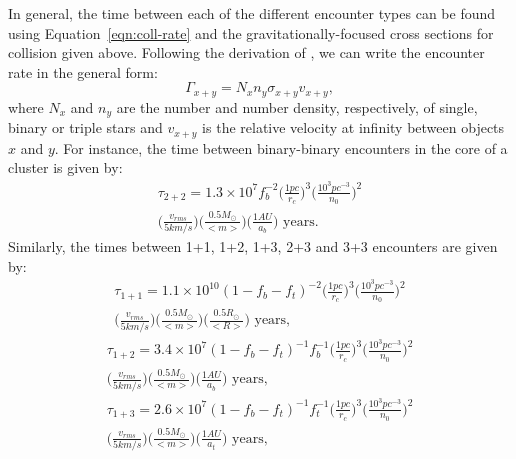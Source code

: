 In general, the time between each of the different encounter
types can be found using Equation~\ref{eqn:coll-rate} and
the gravitationally-focused cross sections for collision given
above.  Following the derivation of \citet{leonard89}, we can write
the encounter rate in the general form:
\begin{equation}
\label{eqn:coll-rate-gen}
\Gamma_{x+y} = N_xn_y{\sigma}_{x+y}v_{x+y},
\end{equation}
where $N_x$ and $n_y$ are the number and number density, respectively,
of single, binary or triple stars and $v_{x+y}$ is the relative
velocity at infinity between objects $x$ and $y$.  For instance, the
time between binary-binary encounters in the core of a cluster is
given by:
\begin{equation}
\begin{gathered}
\label{eqn:coll2+2}
\tau_{2+2} = 1.3 \times 10^7f_b^{-2} \Big(\frac{1
  pc}{r_c}\Big)^3\Big(\frac{10^3
  pc^{-3}}{n_0}\Big)^2 \\
\Big(\frac{v_{rms}}{5 km/s}\Big)\Big(\frac{0.5
  M_{\odot}}{<m>}\Big)\Big(\frac{1
  AU}{a_{b}} \Big) \mbox{ years}.
\end{gathered}
\end{equation}
Similarly, the times between 1+1, 1+2, 1+3, 2+3 and 3+3 encounters are
given by:
\begin{equation}
\begin{gathered}
\label{eqn:coll1+1}
\tau_{1+1} = 1.1 \times 10^{10}(1-f_b-f_t)^{-2}\Big(\frac{1 pc}{r_c}
\Big)^3 \Big(\frac{10^3 pc^{-3}}{n_0} \Big)^2 \\
\Big(\frac{v_{rms}}{5 km/s} \Big) \Big(\frac{0.5 M_{\odot}}{<m>} \Big)
\Big(\frac{0.5 R_{\odot}}{<R>} \Big)\mbox{ years},
\end{gathered}
\end{equation}
\begin{equation}
\begin{gathered}
\label{eqn:coll1+2}
\tau_{1+2} = 3.4 \times 10^7(1-f_b-f_t)^{-1}f_b^{-1} \Big(\frac{1
  pc}{r_c}
\Big)^3 \Big(\frac{10^3 pc^{-3}}{n_0} \Big)^2 \\
\Big(\frac{v_{rms}}{5
  km/s} \Big) \Big(\frac{0.5 M_{\odot}}{<m>} \Big) \Big(\frac{1
  AU}{a_{b}} \Big)\mbox{ years},
\end{gathered}
\end{equation}
\begin{equation}
\begin{gathered}
\label{eqn:coll1+3}
\tau_{1+3} = 2.6 \times 10^7(1-f_b-f_t)^{-1}f_t^{-1} \Big(\frac{1
  pc}{r_c}
\Big)^3 \Big(\frac{10^3 pc^{-3}}{n_0} \Big)^2 \\
\Big(\frac{v_{rms}}{5
  km/s} \Big) \Big(\frac{0.5 M_{\odot}}{<m>} \Big) \Big(\frac{1
  AU}{a_{t}} \Big)\mbox{ years},
\end{gathered}
\end{equation}

